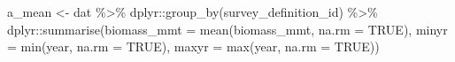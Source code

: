 \documentclass[
  letterpaper,
  oneside,
  open=any]{scrbook}
\newenvironment{Shaded}{\begin{snugshade}}{\end{snugshade}}
\newcommand{\AttributeTok}[1]{\textcolor[rgb]{0.40,0.45,0.13}{#1}}
\newcommand{\ConstantTok}[1]{\textcolor[rgb]{0.56,0.35,0.01}{#1}}
\newcommand{\FunctionTok}[1]{\textcolor[rgb]{0.28,0.35,0.67}{#1}}
\newcommand{\NormalTok}[1]{\textcolor[rgb]{0.00,0.23,0.31}{#1}}
\newcommand{\OtherTok}[1]{\textcolor[rgb]{0.00,0.23,0.31}{#1}}
\newcommand{\SpecialCharTok}[1]{\textcolor[rgb]{0.37,0.37,0.37}{#1}}
\begin{document}
\begin{Shaded}
\begin{Highlighting}[]
\NormalTok{a\_mean }\OtherTok{\textless{}{-}}\NormalTok{ dat }\SpecialCharTok{\%\textgreater{}\%} 
\NormalTok{  dplyr}\SpecialCharTok{::}\FunctionTok{group\_by}\NormalTok{(survey\_definition\_id) }\SpecialCharTok{\%\textgreater{}\%} 
\NormalTok{  dplyr}\SpecialCharTok{::}\FunctionTok{summarise}\NormalTok{(}\AttributeTok{biomass\_mmt =} \FunctionTok{mean}\NormalTok{(biomass\_mmt, }\AttributeTok{na.rm =} \ConstantTok{TRUE}\NormalTok{), }
                   \AttributeTok{minyr =} \FunctionTok{min}\NormalTok{(year, }\AttributeTok{na.rm =} \ConstantTok{TRUE}\NormalTok{), }
                   \AttributeTok{maxyr =} \FunctionTok{max}\NormalTok{(year, }\AttributeTok{na.rm =} \ConstantTok{TRUE}\NormalTok{)) }


\end{Highlighting}
\end{Shaded}
\end{document}
